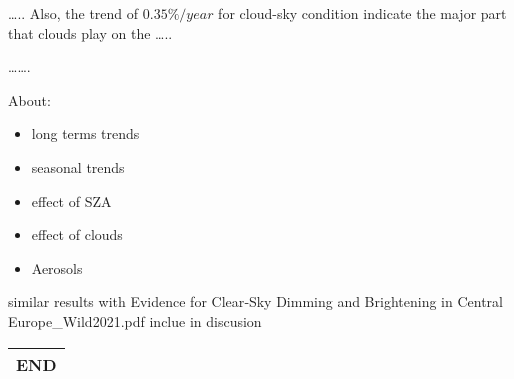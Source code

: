\documentclass[
  preprint, 3p, authoryear]{article}
\begin{document}
\ldots..
Also, the trend of \(0.35\%/year\) for cloud-sky condition indicate the major part that clouds play on the
\ldots..

\ldots\ldots.

About:

\begin{itemize}
\item
  long terms trends
\item
  seasonal trends
\item
  effect of SZA
\item
  effect of clouds
\item
  Aerosols
\end{itemize}

similar results with Evidence for Clear‐Sky Dimming and Brightening in Central Europe\_Wild2021.pdf
inclue in discusion

\begin{longtable}[]{@{}c@{}}
\toprule
\endhead
\textbf{END} \\
\bottomrule
\end{longtable}
\end{document}

